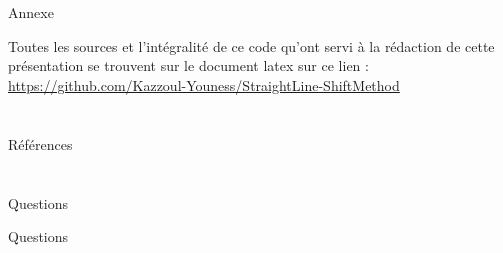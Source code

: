 \documentclass[10pt]{beamer}
\begin{document}
\begin{frame}{}
\end{frame}

\section[Annexe]{}
\begin{frame}{Annexe}
	
	Toutes les sources et l’intégralité de ce code qu'ont servi à la rédaction de cette présentation se trouvent sur le document latex sur ce lien : \\[.5cm]
	\url{https://github.com/Kazzoul-Youness/StraightLine-ShiftMethod}
	
\end{frame}

\section[Références]{}
\begin{frame}{Références}
	
	 	
\end{frame}

\section[Questions]{}
\begin{frame}{Questions}
	\begin{center}
		Questions 
	\end{center}
\end{frame}	

\end{document}
